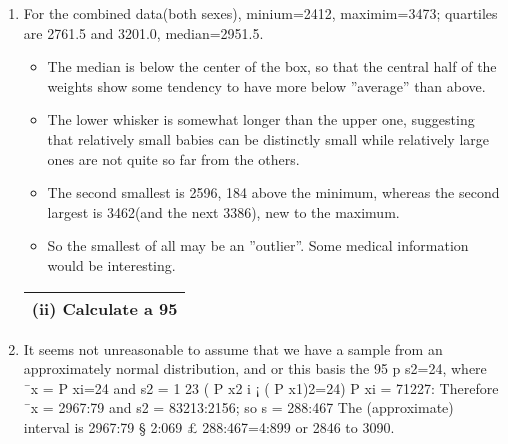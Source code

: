\documentclass[a4paper,12pt]{article}
\begin{document}
\begin{enumerate}
    \item For the combined data(both sexes), minium=2412, maximim=3473; quartiles are 2761.5
and 3201.0, median=2951.5.
\begin{itemize}
    \item The median is below the center of the box, so that the central half of the weights show
some tendency to have more below ”average” than above.
\item The lower whisker is somewhat
longer than the upper one, suggesting that relatively small babies can be distinctly small
while relatively large ones are not quite so far from the others.
\item The second smallest is 2596, 184 above the minimum, whereas the second largest is
3462(and the next 3386), new to the maximum. 
\item So the smallest of all may be an ”outlier”.
Some medical information would be interesting.
\end{itemize}

\begin{table}[ht!]
 
\centering
 
\begin{tabular}{|p{15cm}|}
 
\hline  
 
(ii) Calculate a 95%
 
\\ \hline
  
\end{tabular}

\end{table}


\item  It seems not unreasonable to assume that we have a sample from an approximately
normal distribution, and or this basis the 95%
p
s2=24,
where ¯x =
P
xi=24 and s2 = 1
23 (
P
x2
i ¡ (
P
x1)2=24)
P
xi = 71227:
Therefore ¯x = 2967:79 and s2 = 83213:2156; so s = 288:467 The (approximate) interval
is 2967:79 § 2:069 £ 288:467=4:899 or 2846 to 3090.

\begin{table}[ht!]
 
\centering
 
\begin{tabular}{|p{15cm}|}
 

\end{tabular}
\end{table}
\end{enumerate}
\end{document}
